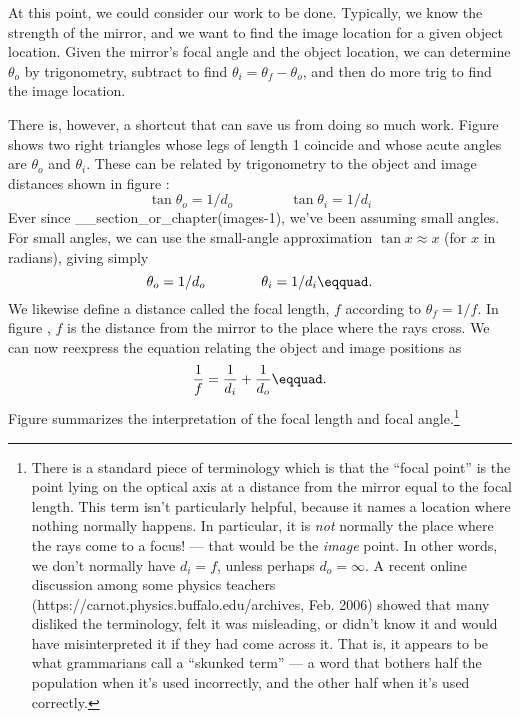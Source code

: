 At this point, we could consider our work to be done.
Typically, we know the strength of the mirror, and we want
to find the image location for a given object location.
Given the mirror's focal angle and the object location, we
can determine $\theta_o$ by trigonometry, subtract to find
$\theta_i=\theta_f-\theta_o$, and then do more trig to
find the image location.

There is, however, a shortcut that can save us from doing so
much work. Figure  shows two right triangles whose legs
of length 1 coincide and whose acute angles are $\theta_o$
and $\theta_i$. These can be related by trigonometry to the
object and image distances shown in figure :
\begin{equation*}
                \tan  \theta_o = 1/d_o \qquad \qquad        \tan  \theta_i  =  1/d_i
\end{equation*}
Ever since __section_or_chapter(images-1), we've been assuming small angles. For
small angles, we can use the small-angle approximation 
$\tan x\approx x$ (for $x$ in radians), giving simply
\begin{equation*}
                \theta_o = 1/d_o \qquad\qquad \theta_i  =  1/d_i\eqquad.
\end{equation*}
We likewise define a distance called the focal length, $f$ according to $\theta_f=1/f$. In figure , $f$
is the distance from the mirror to the place where the rays cross. We can
now reexpress the equation relating the object and image positions as
\begin{equation*}
        \frac{1}{f} = \frac{1}{d_i}+\frac{1}{d_o}\eqquad.
\end{equation*}
Figure  summarizes the interpretation of the focal
length and focal angle.\footnote{There is a standard piece of terminology
which is that the ``focal point'' is the point lying on the optical
axis at a distance from the mirror equal to the focal length.
This term isn't particularly helpful, because it names a location where nothing
normally happens. In particular, it is \emph{not} normally the place where
the rays come to a focus! --- that would be the \emph{image} point.
In other words, we don't normally have $d_i=f$, unless perhaps
$d_o=\infty$. A recent online discussion among some physics teachers 
(https://carnot.physics.buffalo.edu/archives, Feb. 2006) showed that
many disliked the terminology, felt it was misleading, or didn't know it and would have
misinterpreted it if they had come across it. That is, it appears to be what grammarians
call a ``skunked term'' --- a word that bothers half the population when it's used
incorrectly, and the other half when it's used correctly.}

